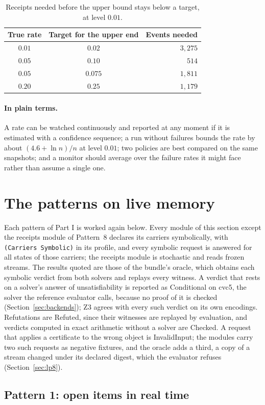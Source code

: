 \documentclass[11pt]{article}
\newcommand{\code}[1]{\texttt{#1}}
\newcommand{\plain}{\paragraph{In plain terms.}}
\theoremstyle{definition}
\theoremstyle{plain}
\begin{document}
\begin{table}[ht]
\centering\small
\begin{tabular}{ccr}
\toprule
True rate & Target for the upper end & Events needed\\
\midrule
$0.01$ & $0.02$ & $3{,}275$\\
$0.05$ & $0.10$ & $514$\\
$0.05$ & $0.075$ & $1{,}811$\\
$0.20$ & $0.25$ & $1{,}179$\\
\bottomrule
\end{tabular}
\caption{Receipts needed before the upper bound stays below a target, at level
$0.01$.}\label{tab:sizes}
\end{table}

\plain A rate can be watched continuously and reported at any moment if it is estimated with a
confidence sequence; a run without failures bounds the rate by about $(4.6+\ln n)/n$ at level
$0.01$; two policies are best compared on the same snapshots; and a monitor should average over the
failure rates it might face rather than assume a single one.
\section{The patterns on live memory}\label{sec:patterns}

Each pattern of Part I is worked again below. Every module of this section except the receipts
module of Pattern~8 declares its carriers symbolically, with \code{(Carriers Symbolic)} in its
profile, and every symbolic request is answered for all states of those carriers; the receipts
module is stochastic and reads frozen streams. The results quoted are those of the bundle's oracle,
which obtains each symbolic verdict from both solvers and replays every witness. A verdict that rests
on a solver's answer of unsatisfiability is reported as Conditional on cvc5, the solver the reference
evaluator calls, because no proof of it is checked (Section~\ref{sec:backends}); Z3 agrees with every
such verdict on its own encodings. Refutations are Refuted, since their witnesses are replayed by
evaluation, and verdicts computed in exact arithmetic without a solver are Checked. A request that
applies a certificate to the wrong object is InvalidInput; the modules carry two such requests as
negative fixtures, and the oracle adds a third, a copy of a stream changed under its declared
digest, which the evaluator refuses (Section~\ref{sec:lp8}).

\subsection{Pattern 1: open items in real time}\label{sec:lp1}
\end{document}
